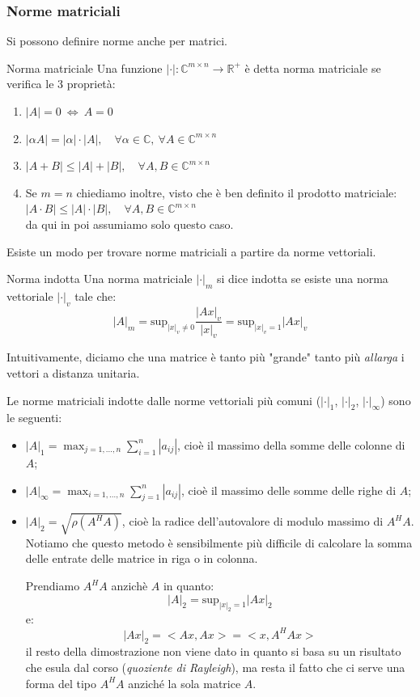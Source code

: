 \documentclass[a4paper,11pt]{article}
\begin{document}
\subsubsection{Norme matriciali}
Si possono definire norme anche per matrici.
\begin{definition}{Norma matriciale} 
	Una funzione $|\cdot|: \mathbb{C}^{m \times n} \rightarrow \mathbb{R}^+$ è detta norma matriciale se verifica le 3 proprietà:
	\begin{enumerate}
		\item $|A| = 0 \ \Leftrightarrow \ A = 0$
		\item $|\alpha A| = |\alpha| \cdot |A|, \quad \forall \alpha \in \mathbb{C}, \ \forall A \in \mathbb{C}^{m \times n}$
		\item $|A + B| \leq |A| + |B|, \quad \forall A, B \in \mathbb{C}^{m \times n}$
		\item Se $m = n$ chiediamo inoltre, visto che è ben definito il prodotto matriciale: \\
			$
				| A \cdot B | \leq |A| \cdot |B|, \quad \forall A, B \in \mathbb{C}^{m \times n}
			$ \\ 
			da qui in poi assumiamo solo questo caso.
	\end{enumerate}
\end{definition}

Esiste un modo per trovare norme matriciali a partire da norme vettoriali.
\begin{definition}{Norma indotta}
	Una norma matriciale $|\cdot|_m$ si dice indotta se esiste una norma vettoriale $|\cdot|_v$ tale che:
	$$
	|A|_m = \mathrm{sup}_{|x|_v \neq 0} \frac{|Ax|_v}{|x|_v} = \mathrm{sup}_{|x|_v = 1} |Ax|_v
	$$
\end{definition}

Intuitivamente, diciamo che una matrice è tanto più "grande" tanto più \textit{allarga} i vettori a distanza unitaria.

Le norme matriciali indotte dalle norme vettoriali più comuni ($|\cdot|_1$, $|\cdot|_2$, $|\cdot|_\infty$) sono le seguenti:
\begin{itemize}
	\item $|A|_1 = \max_{j = 1, ..., n} \sum_{i = 1}^n |a_{ij}|$, cioè il massimo della somme delle colonne di $A$;
	\item $|A|_\infty = \max_{i = 1, ..., n} \sum_{j = 1}^n |a_{ij}|$, cioè il massimo delle somme delle righe di $A$;
	\item $|A|_2 = \sqrt{\rho(A^H A)}$, cioè la radice dell'autovalore di modulo massimo di $A^H A$. Notiamo che questo metodo è sensibilmente più difficile di calcolare la somma delle entrate delle matrice in riga o in colonna. 

		Prendiamo $A^H A$ anzichè $A$ in quanto:
		$$
			|A|_2 = \mathrm{sup}_{|x|_2 = 1} |Ax|_2
		$$
		e:
		$$
			|Ax|_2 = < Ax , Ax > = < x, A^H A x >
		$$
		il resto della dimostrazione non viene dato in quanto si basa su un risultato che esula dal corso (\textit{quoziente di Rayleigh}), ma resta il fatto che ci serve una forma del tipo $A^H A$ anziché la sola matrice $A$.
\end{itemize}
\end{document}
